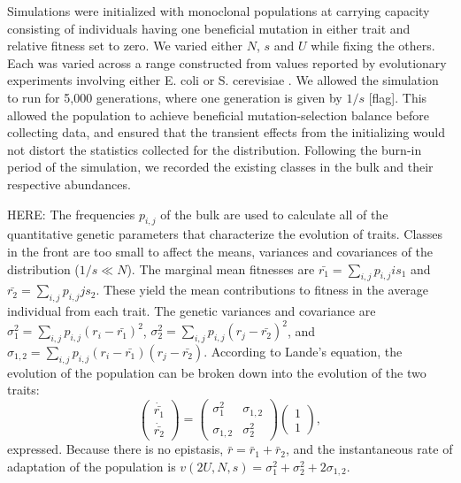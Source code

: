 \documentclass[9pt,twocolumn,twoside]{gsajnl}
\begin{document}
Simulations were initialized with monoclonal populations at carrying capacity consisting of individuals having one beneficial mutation in either trait and relative fitness set to zero. We varied either $N$, $s$ and $U$ while fixing the others. Each was varied across a range constructed from values reported by evolutionary experiments involving either E. coli or S. cerevisiae \citep{desai2007speed,Levy2015,Perfeito2007}. We allowed the simulation to run for 5,000 generations, where one generation is given by $1/s$ [flag]. This allowed the population to achieve beneficial mutation-selection balance before collecting data, and ensured that the transient effects from the initializing would not distort the statistics collected for the distribution. Following the burn-in period of the simulation, we recorded the existing classes in the bulk and their respective abundances. \par

HERE: The frequencies $p_{i,j}$ of the bulk are used to calculate all of the quantitative genetic parameters that characterize the evolution of traits. Classes in the front are too small to affect the means, variances and covariances of the distribution  ($1/s \ll N$).  The marginal mean fitnesses are  $\bar{r_1}=\sum_{i,j} p_{i,j} is_1$ and $\bar{r_2}=\sum_{i,j} p_{i,j} j s_2$. These  yield the mean contributions to fitness in the average individual from each trait. The genetic variances and covariance are $\sigma_1^2 = \sum_{i,j} p_{i,j} (r_i-\bar{r_1})^2$, $\sigma_2^2 = \sum_{i,j} p_{i,j} (r_j-\bar{r_2})^2$, and  $\sigma_{1,2} =\sum_{i,j} p_{i,j} (r_i-\bar{r_1})(r_j-\bar{r_2})$. According to Lande's equation, the evolution of the population can be broken down into the evolution of the two traits:
\begin{equation}\label{eq:4}
\left( \begin{array}{c}
\dot{\bar{r_1}} \\
\dot{\bar{r_2}} 
\end{array} \right)
=
\left( \begin{array}{cc}
\sigma_1^2 & \sigma_{1,2} \\
\sigma_{1,2} & \sigma_2^2 
\end{array}\right)
\left(\begin{array}{c}
1 \\
1 
\end{array}\right),
\end{equation}
 expressed. Because there is no epistasis, $\bar{r} = \bar{r}_1 +\bar{r}_2$, and the instantaneous rate of adaptation of the population is $v(2U,N,s) = \sigma_1^2 +\sigma_2^2 + 2 \sigma_{1,2}$.  \par
\end{document}
